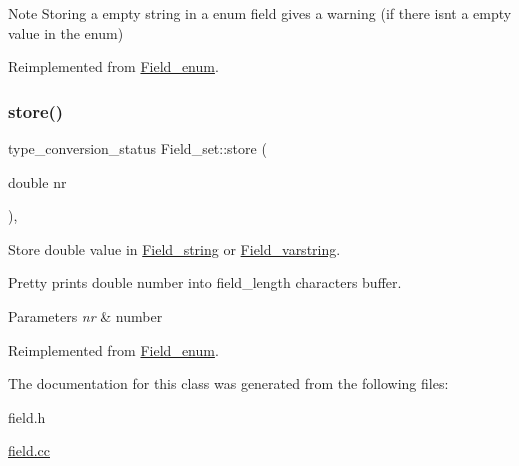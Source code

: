 \begin{DoxyNote}{Note}
Storing a empty string in a enum field gives a warning (if there isn\textquotesingle{}t a empty value in the enum) 
\end{DoxyNote}


Reimplemented from \mbox{\hyperlink{classField__enum_a94360342df3a8e26e37d2e479d36cbb5}{Field\+\_\+enum}}.

\mbox{\label{classField__set_a58b1852786b3bfe85a3cd2dd7edbfaf2}} 
\subsubsection{\texorpdfstring{store()}{store()}\hspace{0.1cm}{\footnotesize\ttfamily [2/2]}}
{\footnotesize\ttfamily type\+\_\+conversion\+\_\+status Field\+\_\+set\+::store (\begin{DoxyParamCaption}\item[{double}]{nr }\end{DoxyParamCaption})\hspace{0.3cm}{\ttfamily [inline]}, {\ttfamily [virtual]}}

Store double value in \mbox{\hyperlink{classField__string}{Field\+\_\+string}} or \mbox{\hyperlink{classField__varstring}{Field\+\_\+varstring}}.

Pretty prints double number into field\+\_\+length characters buffer.


\begin{DoxyParams}{Parameters}
{\em nr} & number \\
\hline
\end{DoxyParams}


Reimplemented from \mbox{\hyperlink{classField__enum_a82c1cdf5b47cd0266d9974e834695523}{Field\+\_\+enum}}.



The documentation for this class was generated from the following files\+:\begin{DoxyCompactItemize}
\item 
field.\+h\item 
\mbox{\hyperlink{field_8cc}{field.\+cc}}\end{DoxyCompactItemize}
